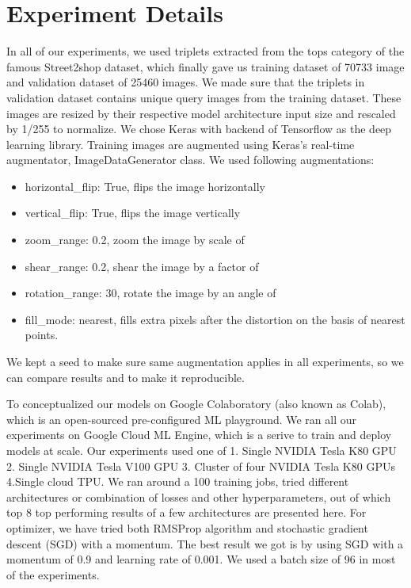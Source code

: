 \documentclass[10pt,twocolumn,letterpaper]{article}
\newcommand{\rpm}{\raisebox{.2ex}{}}
\begin{document}
\section{Experiment Details}In all of our experiments, we used triplets extracted from the tops category of the famous Street2shop dataset, which finally gave us training dataset of 70733 image and validation dataset of 25460 images. We made sure that the triplets in validation dataset contains unique query images from the training dataset. These images are resized by their respective model architecture input size and rescaled by 1/255 to normalize. We chose Keras \cite{c34} with backend of Tensorflow \cite{c35} as the deep learning library. Training images are augmented using Keras's real-time augmentator, ImageDataGenerator class. We used following augmentations:
\vspace{-2mm}
\begin{itemize}
\itemsep-0.2em
\item horizontal\_flip: True, flips the image horizontally
\item vertical\_flip: True, flips the image vertically
\item zoom\_range: 0.2, zoom the image by scale of \rpm{0.2}
\item shear\_range: 0.2, shear the image by a factor of \rpm{0.2}
\item rotation\_range: 30, rotate the image by an angle of \rpm{30}
\item fill\_mode: nearest, fills extra pixels after the distortion on the basis of nearest points.
\end{itemize}
We kept a seed to make sure same augmentation applies in all experiments, so we can compare results and to make it reproducible.

To conceptualized our models on Google Colaboratory (also known as Colab), which is an open-sourced pre-configured ML playground. We ran all our experiments on Google Cloud ML Engine, which is a serive to train and deploy models at scale. Our experiments used one of 1. Single NVIDIA Tesla K80 GPU 2. Single NVIDIA Tesla V100 GPU 3. Cluster of four NVIDIA Tesla K80 GPUs 4.Single cloud TPU. We ran around a 100 training jobs, tried different architectures or combination of losses and other hyperparameters, out of which top 8 top performing results of a few architectures are presented here. For optimizer, we have tried both RMSProp algorithm and stochastic gradient descent (SGD) with a momentum. The best result we got is by using SGD with a momentum of 0.9 and learning rate of 0.001. We used a batch size of 96 in most of the experiments.
\end{document}
